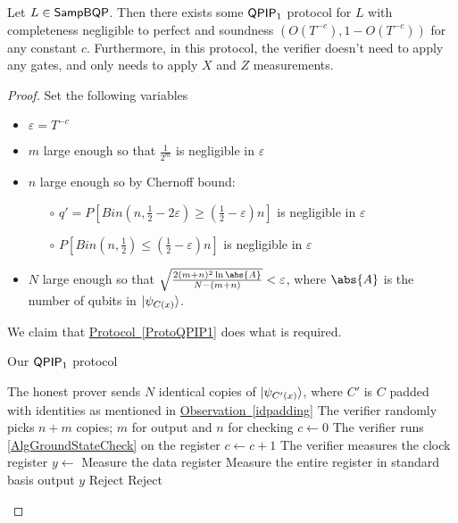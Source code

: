 \begin{theorem}
	Let $L\in\operatorname{\mathsf{SampBQP}}$. Then there exists some $\operatorname{\mathsf{QPIP}}_1$ protocol for $L$ with completeness negligible to perfect and soundness $(O(T^{-c}), 1-O(T^{-c}))$ for any constant $c$. Furthermore, in this protocol, the verifier doesn't need to apply any gates, and only needs to apply $X$ and $Z$ measurements.
\end{theorem}
\begin{proof}
	Set the following variables
	\begin{itemize}
		\item $\varepsilon=T^{-c}$
		\item $m$ large enough so that $\frac{1}{2^m}$ is negligible in $\varepsilon$
		\item $n$ large enough so by Chernoff bound:
			\begin{itemize}
				\item[$\circ$] $q'=P\left[Bin(n, \frac{1}{2}-2\varepsilon)\geq\left(\frac{1}{2}-\varepsilon\right)n\right]$ is negligible in $\varepsilon$
				\item[$\circ$] $P\left[Bin(n, \frac{1}{2})\leq\left(\frac{1}{2}-\varepsilon\right)n\right]$ is negligible in $\varepsilon$
			\end{itemize}
		\item $N$ large enough so that $\sqrt{\frac{2(m+n)^2\ln\abs{A}}{N-(m+n)}}<\varepsilon$, where $\abs{A}$ is the number of qubits in $\ket{\psi_{C(x)}}$.
	\end{itemize}

	We claim that \hyperref[ProtoQPIP1]{Protocol~\ref*{ProtoQPIP1}} does what is required.
	\begin{algorithm}
		\caption{Our $\operatorname{\mathsf{QPIP}}_1$ protocol}
		\label{ProtoQPIP1}
		\begin{algorithmic}[1]
			\State The honest prover sends $N$ identical copies of $\ket{\psi_{C'(x)}}$, where $C'$ is $C$ padded with identities as mentioned in \hyperref[idpadding]{Observation~\ref*{idpadding}}
			\State The verifier randomly picks $n+m$ copies; $m$ for output and $n$ for checking
			\State $c\gets0$
			    \State The verifier runs \autoref{AlgGroundStateCheck} on the register
			        $c\gets c+1$
			    \EndIf
			    \State The verifier measures the clock register
			            $y\gets$ Measure the data register
                    \EndIf
			    \EndIf
			    \Else
			    \State Measure the entire register in standard basis
			    \EndIf
			\EndFor
			\State output $y$
			\Else
			\State Reject
			\EndIf
			\Else
			\State Reject
			\EndIf
		\end{algorithmic}
	\end{algorithm}
	

\end{proof}

